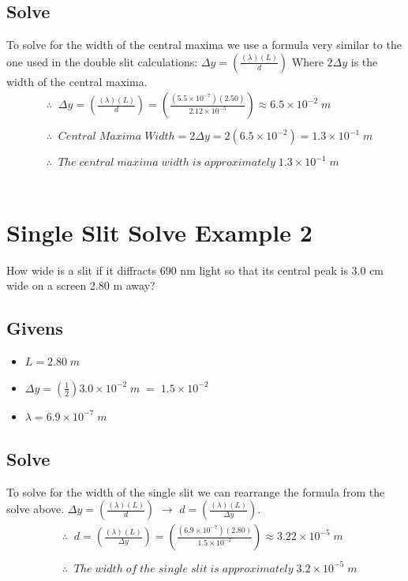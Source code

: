 \documentclass{article}
\begin{document}
\subsection*{Solve}
To solve for the width of the central maxima we use a formula very similar to the one used in the double slit calculations: $\Delta y = \left(\frac{(\lambda)(L)}{d}\right)$ Where $2\Delta y$ is the width of the central maxima.\\
\begin{align*}
     & \therefore\;\;\Delta y = \left(\frac{(\lambda)(L)}{d}\right) = \left(\frac{(5.5 \times 10^{-7})(2.50)}{2.12 \times 10^{-5}}\right) \approx 6.5 \times 10^{-2}\;m \\\\
     & \therefore\;\;Central\;Maxima\;Width = 2\Delta y = 2(6.5 \times 10^{-2}) = 1.3 \times 10^{-1}\;m\\\\
     & \therefore\;\;The\;central\;maxima\;width\;is\;approximately\;1.3 \times 10^{-1}\;m
\end{align*}\leavevmode\\

\section{Single Slit Solve Example 2}
How wide is a slit if it diffracts 690 nm light so that its central peak is 3.0 cm wide on a screen 2.80 m away?
\subsection*{Givens}
\begin{itemize}
    \item $L = 2.80\;m$
    \item $ \Delta y = (\frac{1}{2})3.0 \times 10^{-2}\;m \;=\;1.5 \times 10^{-2}$
    \item $\lambda = 6.9 \times 10^{-7}\;m$
\end{itemize}\leavevmode
\subsection*{Solve}
To solve for the width of the single slit we can rearrange the formula from the solve above. $\Delta y = \left(\frac{(\lambda)(L)}{d}\right)$ $\to$ $d = \left(\frac{(\lambda)(L)}{\Delta y}\right)$.\\
\begin{align*}
     & \therefore\;\;d = \left(\frac{(\lambda)(L)}{\Delta y}\right) = \left(\frac{(6.9 \times 10^{-7})(2.80)}{1.5 \times 10^{-2}}\right) \approx 3.22 \times 10^{-5}\;m\\\\
     & \therefore\;\;The\;width \;of\;the\;single\;slit\;is\;approximately\;3.2 \times 10^{-5}\;m
\end{align*}\leavevmode\\
\end{document}
